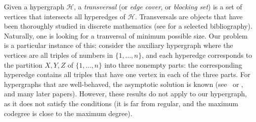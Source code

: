 \documentclass[11pt,a4paper]{article}
\begin{document}
Given a hypergraph $\mathcal{H}$, a {\em transversal} (or {\em edge cover}, or {\em blocking set}) is a set of vertices that intersects all hyperedges of $\mathcal{H}$. Transversals are objects that have been thoroughly studied in discrete mathematics (see \cite{alon90:transversals, bujtas12:transversals, henning18:transversals, henning20:transversals,lai90:transversals, lonc13:transversals} for a selected bibliography). Naturally, one is looking for a tranversal of minimum possible size. Our problem is a particular instance of this: consider the auxiliary hypergraph where the vertices are all triples of numbers in $\{1,\dots,n\}$, and each hyperedge corresponds to the partition $X,Y,Z$ of $\{1,\dots,n\}$ into three nonempty parts: the corresponding hyperedge contains all triples that have one vertex in each of the three parts.
For hypergraphs that are well-behaved, the asymptotic solution is known (see~\cite{GS} or \cite{Pippenger_Spencer}, and many later papers).
However, these results do not apply to our hypergraph, as it does not satisfy the conditions (it is far from regular, and the maximum codegree is close to the maximum degree).

\end{document}
